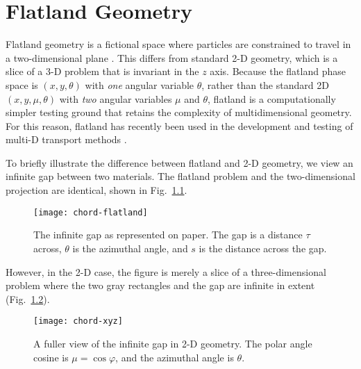 
\chapter{Flatland Geometry}\label{chap:flatland}

Flatland geometry is a fictional space where particles are
constrained to travel in a two-dimensional plane \cite{Abb1884,Asa2008}. This
differs from standard 2-D
geometry, which is a slice of a 3-D problem that is invariant in the $z$ axis.
Because the flatland phase space is
$(x,y,\theta)$ with \emph{one} angular variable $\theta$, rather than the
standard 2D $(x,y,\mu,\theta)$ with \emph{two} angular variables $\mu$ and
$\theta$, flatland is a computationally simpler testing ground that retains the
complexity of multidimensional geometry. For this reason, flatland has recently
been used in the development and testing of multi-D transport methods
\cite{Lar2009c,Joh2011,Tra2011}.

To briefly illustrate the difference between flatland and 2-D geometry, we
view an infinite gap between two materials. The flatland problem and the
two-dimensional projection are identical, shown in Fig.~\ref{fig:chordFlatland}.
%
\begin{figure}[htb]
  \centering
  \texttt{[image: chord-flatland]}
  \caption[The infinite gap as represented on paper.]%
  {The infinite gap as represented on paper. The gap is a distance
  $\tau$ across, $\theta$ is the azimuthal angle, and $s$ is the
  distance across the gap.}
  \label{fig:chordFlatland}
\end{figure}
%
However, in the 2-D case, the figure is merely a slice of a three-dimensional
problem where the two gray rectangles and the gap are infinite in extent
(Fig.~\ref{fig:chordXy}).
%
\begin{figure}[htb]
  \centering
  \texttt{[image: chord-xyz]}
  \caption[A fuller view of the infinite gap in 2-D geometry.]%
  {A fuller view of the infinite gap in 2-D geometry.
  The polar angle cosine is $\mu= \cos \varphi$, and the azimuthal angle is
  $\theta$.}
  \label{fig:chordXy}
\end{figure}

%

